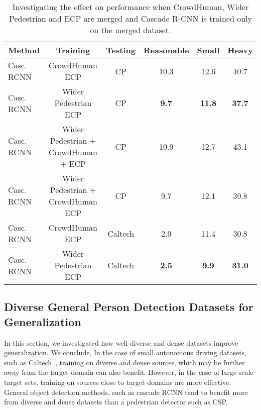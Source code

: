 \documentclass[final]{cvpr}
\newcommand{\caltech}[1]{{Caltech~\cite{dollar2012pedestrian}}}
\begin{document}
\begin{table*}[tb]
\centering
\caption{Investigating the effect on performance when CrowdHuman, Wider Pedestrian and ECP are merged and Cascade R-CNN \cite{cai2019cascade} is trained only on the merged dataset.}
\label{tab:icon-collapsed}
\begin{tabular}{l|c|c|c|c|c}
\hline
Method & Training        & Testing     & Reasonable & Small & Heavy \\ \hline
Casc. RCNN&CrowdHuman  ECP & CP & {10.3}     & {12.6}   & {40.7}  \\ \hline
Casc. RCNN&Wider Pedestrian  ECP & CP & \textbf{9.7}     & \textbf{11.8}   & \textbf{37.7}  \\ \hline
Casc. RCNN&Wider Pedestrian + CrowdHuman + ECP & CP & 10.9     & 12.7   & 43.1  \\ \hline
Casc. RCNN&Wider Pedestrian + CrowdHuman  ECP & CP & {9.7}     & {12.1}   & {39.8}  \\ \hline
\hline \hline 
Casc. RCNN&CrowdHuman  ECP & Caltech & {2.9}     & {11.4}   & {30.8}  \\ \hline
Casc. RCNN &Wider Pedestrian  ECP & Caltech & \textbf{2.5}     & \textbf{9.9}   & \textbf{31.0}  \\ \hline
\end{tabular}
\end{table*}





\subsection{Diverse General Person Detection Datasets for Generalization} \label{gen:div}
In this section, we investigated how well diverse and dense datasets improve generalization. We conclude, In the case of small autonomous driving datasets, such as \caltech{}, training on diverse and dense sources, which may be further away from the target domain can also benefit. However, in the case of large scale target sets, training on sources close to target domains are more effective. General object detection methods, such as cascade RCNN tend to benefit more from diverse and dense datasets than a pedestrian detector such as CSP. 
\end{document}
